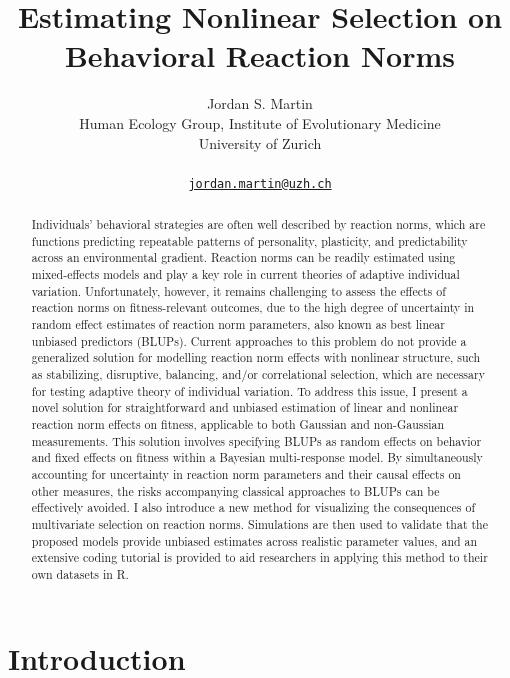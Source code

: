 \documentclass{article}
\title{Estimating Nonlinear Selection on \linebreak Behavioral Reaction
Norms}
\author{
    Jordan S. Martin
   \\
    Human Ecology Group, Institute of Evolutionary Medicine \\
    University of Zurich \\
   \\
  \texttt{\href{mailto:jordan.martin@uzh.ch}{\nolinkurl{jordan.martin@uzh.ch}}} \\
  }
\begin{document}
\maketitle

\def\tightlist{}


\begin{abstract}
Individuals' behavioral strategies are often well described by reaction
norms, which are functions predicting repeatable patterns of
personality, plasticity, and predictability across an environmental
gradient. Reaction norms can be readily estimated using mixed-effects
models and play a key role in current theories of adaptive individual
variation. Unfortunately, however, it remains challenging to assess the
effects of reaction norms on fitness-relevant outcomes, due to the high
degree of uncertainty in random effect estimates of reaction norm
parameters, also known as best linear unbiased predictors (BLUPs).
Current approaches to this problem do not provide a generalized solution
for modelling reaction norm effects with nonlinear structure, such as
stabilizing, disruptive, balancing, and/or correlational selection,
which are necessary for testing adaptive theory of individual variation.
To address this issue, I present a novel solution for straightforward
and unbiased estimation of linear and nonlinear reaction norm effects on
fitness, applicable to both Gaussian and non-Gaussian measurements. This
solution involves specifying BLUPs as random effects on behavior and
fixed effects on fitness within a Bayesian multi-response model. By
simultaneously accounting for uncertainty in reaction norm parameters
and their causal effects on other measures, the risks accompanying
classical approaches to BLUPs can be effectively avoided. I also
introduce a new method for visualizing the consequences of multivariate
selection on reaction norms. Simulations are then used to validate that
the proposed models provide unbiased estimates across realistic
parameter values, and an extensive coding tutorial is provided to aid
researchers in applying this method to their own datasets in R.
\end{abstract}


\hypertarget{introduction}{%
\section{Introduction}\label{introduction}}
\end{document}
